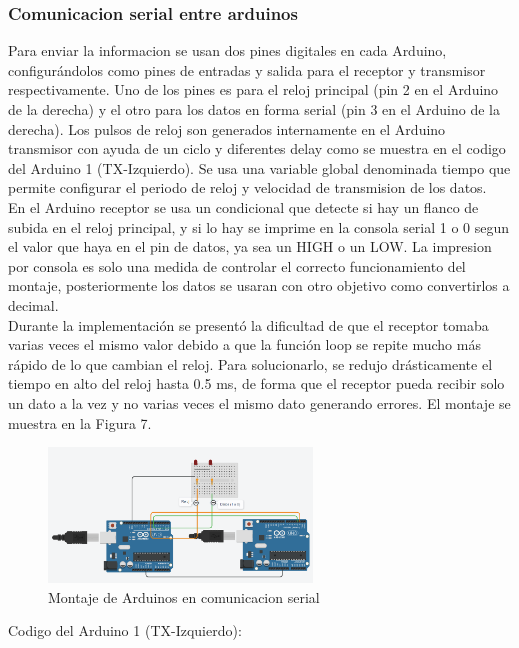 \documentclass{article}
\begin{document}
\subsubsection{Comunicacion serial entre arduinos}
Para enviar la informacion se usan dos pines digitales en cada Arduino, configurándolos como pines de entradas y salida para el receptor y transmisor respectivamente. Uno de los pines es para el reloj principal (pin 2 en el Arduino de la derecha)  y el otro para los datos en forma serial (pin 3 en el Arduino de la derecha). Los pulsos de reloj son generados internamente en el Arduino transmisor con ayuda de un ciclo y diferentes delay como se muestra en el codigo del Arduino 1 (TX-Izquierdo).
Se usa una variable global denominada tiempo que permite configurar el periodo de reloj y velocidad de transmision de los datos.\\

En el Arduino receptor se usa un condicional que detecte si hay un flanco de subida en el reloj principal, y si lo hay se imprime en la consola serial 1 o 0 segun el valor que haya en el pin de datos, ya sea un HIGH o un LOW. La impresion por consola es solo una medida de controlar el correcto funcionamiento del montaje, posteriormente los datos se usaran con otro objetivo como convertirlos a decimal.\\

Durante la implementación se presentó la dificultad de que el receptor tomaba varias veces el mismo valor debido a que la función loop se repite mucho más rápido de lo que cambian el reloj. Para solucionarlo, se redujo drásticamente el tiempo en alto del reloj hasta 0.5 ms, de forma que el receptor pueda recibir solo un dato a la vez y no varias veces el mismo dato generando errores. El montaje se muestra en la Figura 7.

\begin{figure}[!ht] 
\includegraphics[width=7cm]{montajeSerial.PNG}
\centering
\caption{Montaje de Arduinos en comunicacion serial}
\end{figure}

\noindent
Codigo del Arduino 1 (TX-Izquierdo):
\end{document}
